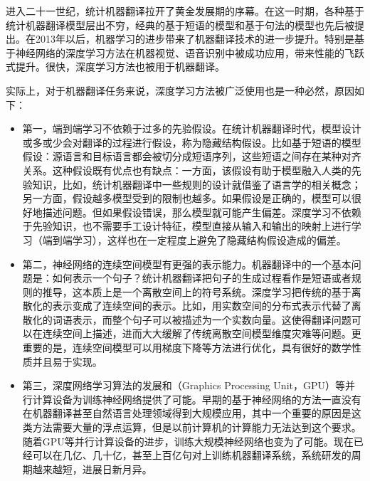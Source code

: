 \parinterval 进入二十一世纪，统计机器翻译拉开了黄金发展期的序幕。在这一时期，各种基于统计机器翻译模型层出不穷，经典的基于短语的模型和基于句法的模型也先后被提出。在2013年以后，机器学习的进步带来了机器翻译技术的进一步提升。特别是基于神经网络的深度学习方法在机器视觉、语音识别中被成功应用，带来性能的飞跃式提升。很快，深度学习方法也被用于机器翻译。

\parinterval 实际上，对于机器翻译任务来说，深度学习方法被广泛使用也是一种必然，原因如下：

\begin{itemize}
\vspace{0.5em}
\item 第一，端到端学习不依赖于过多的先验假设。在统计机器翻译时代，模型设计或多或少会对翻译的过程进行假设，称为隐藏结构假设。比如基于短语的模型假设：源语言和目标语言都会被切分成短语序列，这些短语之间存在某种对齐关系。这种假设既有优点也有缺点：一方面，该假设有助于模型融入人类的先验知识，比如，统计机器翻译中一些规则的设计就借鉴了语言学的相关概念；另一方面，假设越多模型受到的限制也越多。如果假设是正确的，模型可以很好地描述问题。但如果假设错误，那么模型就可能产生偏差。深度学习不依赖于先验知识，也不需要手工设计特征，模型直接从输入和输出的映射上进行学习（端到端学习），这样也在一定程度上避免了隐藏结构假设造成的偏差。
\vspace{0.5em}
\item 第二，神经网络的连续空间模型有更强的表示能力。机器翻译中的一个基本问题是：如何表示一个句子？统计机器翻译把句子的生成过程看作是短语或者规则的推导，这本质上是一个离散空间上的符号系统。深度学习把传统的基于离散化的表示变成了连续空间的表示。比如，用实数空间的分布式表示代替了离散化的词语表示，而整个句子可以被描述为一个实数向量。这使得翻译问题可以在连续空间上描述，进而大大缓解了传统离散空间模型维度灾难等问题。更重要的是，连续空间模型可以用梯度下降等方法进行优化，具有很好的数学性质并且易于实现。
\vspace{0.5em}
\item 第三，深度网络学习算法的发展和{\small{}}（Graphics Processing Unit，GPU）等并行计算设备为训练神经网络提供了可能。早期的基于神经网络的方法一直没有在机器翻译甚至自然语言处理领域得到大规模应用，其中一个重要的原因是这类方法需要大量的浮点运算，但是以前计算机的计算能力无法达到这个要求。随着GPU等并行计算设备的进步，训练大规模神经网络也变为了可能。现在已经可以在几亿、几十亿，甚至上百亿句对上训练机器翻译系统，系统研发的周期越来越短，进展日新月异。
\vspace{0.5em}
\end{itemize}

